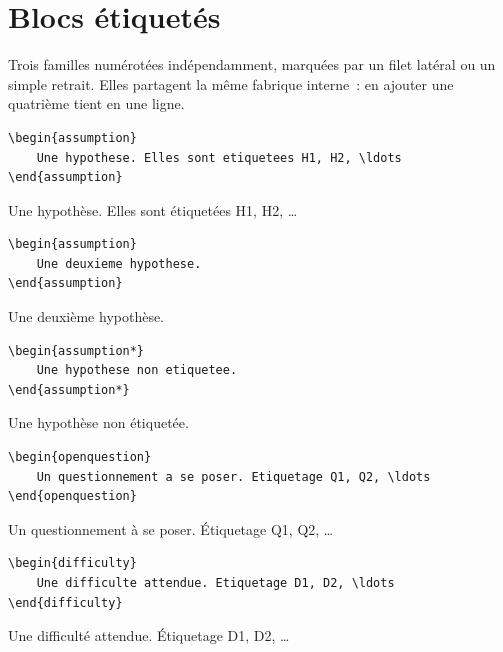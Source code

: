 \section{Blocs étiquetés}%
\label{sec:tagged}

Trois familles numérotées indépendamment, marquées par un filet latéral ou un
simple retrait. Elles partagent la même fabrique interne~: en ajouter une
quatrième tient en une ligne.

\begin{lstlisting}
\begin{assumption}
    Une hypothese. Elles sont etiquetees H1, H2, \ldots
\end{assumption}
\end{lstlisting}
\begin{assumption}
    Une hypothèse. Elles sont étiquetées H1, H2, \ldots
\end{assumption}

\begin{lstlisting}
\begin{assumption}
    Une deuxieme hypothese.
\end{assumption}
\end{lstlisting}
\begin{assumption}
    Une deuxième hypothèse.
\end{assumption}

\begin{lstlisting}
\begin{assumption*}
    Une hypothese non etiquetee.
\end{assumption*}
\end{lstlisting}
\begin{assumption*}
    Une hypothèse non étiquetée.
\end{assumption*}

\begin{lstlisting}
\begin{openquestion}
    Un questionnement a se poser. Etiquetage Q1, Q2, \ldots
\end{openquestion}
\end{lstlisting}
\begin{openquestion}
    Un questionnement à se poser. Étiquetage Q1, Q2, \ldots
\end{openquestion}

\begin{lstlisting}
\begin{difficulty}
    Une difficulte attendue. Etiquetage D1, D2, \ldots
\end{difficulty}
\end{lstlisting}
\begin{difficulty}
    Une difficulté attendue. Étiquetage D1, D2, \ldots
\end{difficulty}

